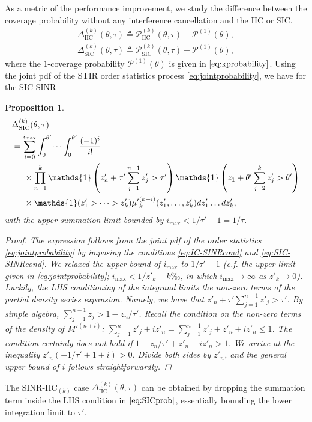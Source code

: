 \documentclass[lettersize,journal]{IEEEtran}
\newtheorem{prop}[theorem]{Proposition}
\begin{document}
 As a metric of the performance improvement, we study the difference between the coverage probability without any interference cancellation and the IIC or SIC. 
\begin{align}
  \Delta^{(k)}_{\text{IIC}}(\theta,\tau) \triangleq \mathcal{P}^{(k)}_{\text{IIC}}(\theta,\tau)- \mathcal{P}^{(1)}(\theta),\nonumber\\
  \Delta^{(k)}_{\text{SIC}}(\theta,\tau) \triangleq \mathcal{P}^{(k)}_{\text{SIC}}(\theta,\tau)- \mathcal{P}^{(1)}(\theta),
\end{align}
where the $1$-coverage probability  $\mathcal{P}^{(1)}(\theta)$ is given in $\eqref{eq:kprobability}$. Using the joint pdf of the STIR order statistics process \eqref{eq:jointprobability}, we have for the SIC-SINR
\begin{prop}
  \begin{align}
    \label{eq:SICprob}
    & \Delta^{(k)}_{\text{SIC}}(\theta,\tau) \nonumber\\
    &=\sum^{i_{\text{max}}}_{i=0} \int_{0}^{\theta'} \dots \int_{0}^{\theta'}\frac{(-1)^i}{i!}\nonumber \\
    & \hspace{0.5cm}\times \prod_{n=1}^k\mathds{1}\left( z'_n+ \tau'\sum_{j=1}^{n-1} z'_j>\tau' \right)  \mathds{1}\left(z_1+  \theta'\sum_{j=2}^k z'_j>\theta' \right) \nonumber \\
    &\hspace{0.5cm} \times \mathds{1}(z'_1>\dots>z'_k){\mu'}_k^{(k+i)}(z'_1,\dots,z'_k) d z'_1 \dots d z'_k,
  \end{align}
  with the upper summation limit bounded by $i_{\text{max}} < 1/\tau'-1=1/\tau.$ 
  \begin{proof}
    The expression follows from the joint pdf of the order statistics \eqref{eq:jointprobability} by imposing the conditions \eqref{eq:IC-SINRcond} and \eqref{eq:SIC-SINRcond}. We relaxed the upper bound of  $i_{\text{max}}$ to $1/\tau'-1$ (c.f. the upper limit given in \eqref{eq:jointprobability}; $i_{\text{max}} < 1/z'_{k}-k‰$, in which $i_{\text{max}} \rightarrow \infty$ as $z'_k \rightarrow 0$). Luckily, the LHS conditioning of the integrand limits the non-zero terms of the partial density series expansion. Namely, we have that $z'_{n}+\tau'\sum_{j=1}^{n-1}z'_{j}>\tau'$. By simple algebra, $\sum_{j=1}^{n-1}z_{j}> 1-z_{n}/\tau'$. Recall the condition on the non-zero terms of the density of $M'^{(n+i)}$:  $\sum_{j=1}^n z'_{j}+i z'_{n} =\sum_{j=1}^{n-1}z'_{j} +z'_{n}+i z'_{n}  \leq 1$. The condition certainly \textit{does not} hold if $1-z_{n}/\tau'+ z'_{n}+i z'_{n}>1$. We arrive at the inequality $z'_{n} \left(-1/\tau' + 1 +i \right)>0$. Divide both sides by $z'_{n}$, and the general upper bound of $i$ follows straightforwardly.

    


  \end{proof}
\end{prop}
The SINR-IIC$_{(k)}$ case $\Delta^{(k)}_{\text{IIC}}(\theta,\tau)$ can be obtained by dropping the summation term inside the LHS condition in $\eqref{eq:SICprob}$, essentially bounding the lower integration limit to $\tau'$.
\end{document}
